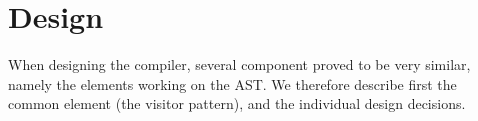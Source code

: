 \section{Design}
\label{sec:design}

When designing the \lang{} compiler, several component proved to be very similar, namely the elements working on the AST. We therefore describe first the common element (the visitor pattern), and the individual design decisions.




